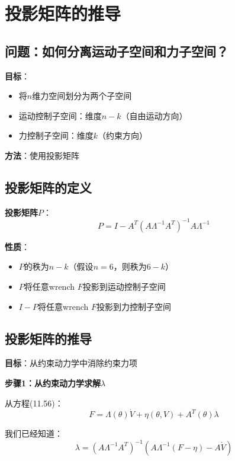 \documentclass[12pt,a4paper]{article}
\begin{document}
\section{投影矩阵的推导}

\subsection{问题：如何分离运动子空间和力子空间？}

\textbf{目标}：
\begin{itemize}
\item 将$n$维力空间划分为两个子空间
\item 运动控制子空间：维度$n-k$（自由运动方向）
\item 力控制子空间：维度$k$（约束方向）
\end{itemize}

\textbf{方法}：使用投影矩阵

\subsection{投影矩阵的定义}

\textbf{投影矩阵$P$}：
\begin{equation}
P = I - A^T(A\Lambda^{-1}A^T)^{-1}A\Lambda^{-1} \tag{11.60}
\end{equation}

\textbf{性质}：
\begin{itemize}
\item $P$的秩为$n-k$（假设$n=6$，则秩为$6-k$）
\item $P$将任意wrench $F$投影到运动控制子空间
\item $I - P$将任意wrench $F$投影到力控制子空间
\end{itemize}

\subsection{投影矩阵的推导}

\textbf{目标}：从约束动力学中消除约束力项

\textbf{步骤1：从约束动力学求解$\lambda$}

从方程(11.56)：
\begin{equation}
F = \Lambda(\theta)\dot{V} + \eta(\theta, V) + A^T(\theta)\lambda
\end{equation}

我们已经知道：
\begin{equation}
\lambda = (A\Lambda^{-1}A^T)^{-1}(A\Lambda^{-1}(F - \eta) - A\dot{V})
\end{equation}
\end{document}
